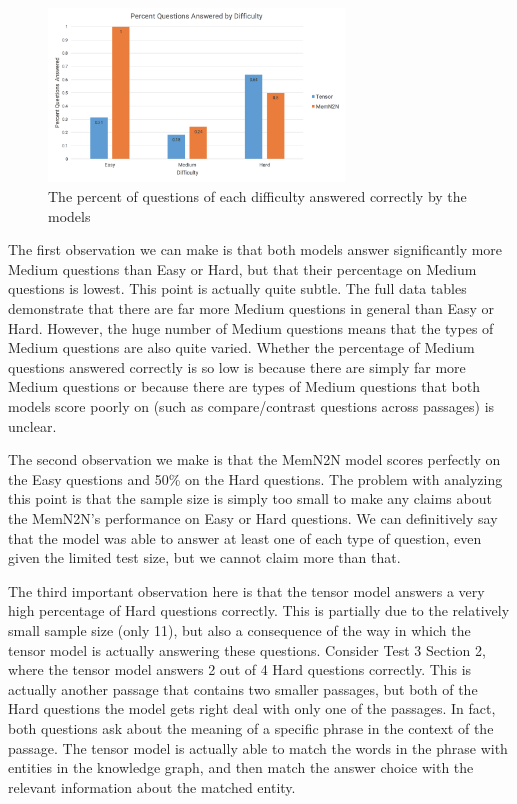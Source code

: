 \documentclass[pageno]{final_paper}
\begin{document}
\begin{figure}[!tb]
    \centering
    \includegraphics[width=0.7\textwidth,keepaspectratio]{figures/qa_by_difficulty_percent.png}
    \caption{The percent of questions of each difficulty answered correctly by the models}
    \label{fig: qa_by_difficulty_percent}
\end{figure}

The first observation we can make is that both models answer significantly more
Medium questions than Easy or Hard, but that their percentage on Medium
questions is lowest. This point is actually quite subtle. The full data tables
demonstrate that there are far more Medium questions in general than Easy or
Hard. However, the huge number of Medium questions means that the types of
Medium questions are also quite varied. Whether the percentage of Medium
questions answered correctly is so low is because there are simply far more
Medium questions or because there are types of Medium questions that both models
score poorly on (such as compare/contrast questions across passages) is unclear.

The second observation we make is that the MemN2N model scores perfectly on the
Easy questions and 50\% on the Hard questions. The problem with analyzing this
point is that the sample size is simply too small to make any claims about the
MemN2N's performance on Easy or Hard questions. We can definitively say that
the model was able to answer at least one of each type of question, even given
the limited test size, but we cannot claim more than that.

The third important observation here is that the tensor model answers a very
high percentage of Hard questions correctly. This is partially due to the
relatively small sample size (only 11), but also a consequence of the way in
which the tensor model is actually answering these questions. Consider Test 3
Section 2, where the tensor model answers 2 out of 4 Hard questions correctly.
This is actually another passage that contains two smaller passages, but both of
the Hard questions the model gets right deal with only one of the passages. In
fact, both questions ask about the meaning of a specific phrase in the context
of the passage. The tensor model is actually able to match the words in the
phrase with entities in the knowledge graph, and then match the answer choice
with the relevant information about the matched entity.
\end{document}
